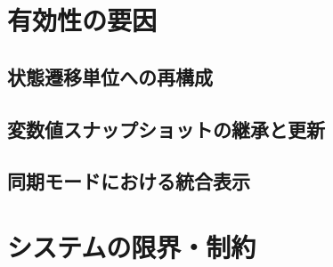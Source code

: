 \documentclass[12pt]{jreport}
\begin{document}
\section{有効性の要因}
\subsection{状態遷移単位への再構成}

\subsection{変数値スナップショットの継承と更新}

\subsection{同期モードにおける統合表示}

\section{システムの限界・制約}
\end{document}
